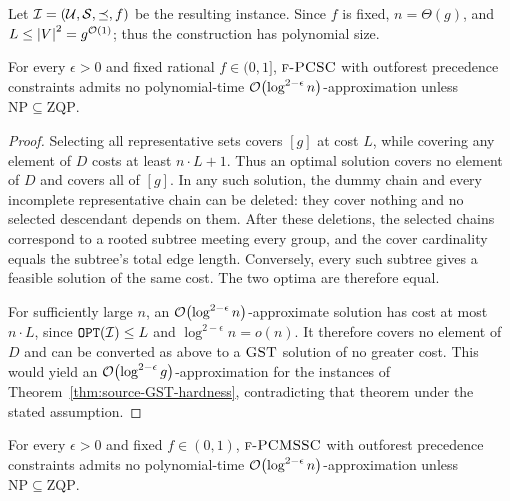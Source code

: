     Let $\mathcal{I}=(\mathcal{U},\mathcal{S},\preceq,f)$ be the resulting instance. Since $f$ is fixed, $n=\Theta(g)$, and $L\leq\mathopen{}\left| V \right|^2=g^{\mathcal{O}(1)}$; thus the construction has polynomial size.

\begin{theorem}\label{thm:PCSC-outforest-hardness}
    For every $\epsilon>0$ and fixed rational $f\in(0,1]$, $\textup{\textsc{f-PCSC}}$ with outforest precedence constraints admits no polynomial-time $\mathcal{O}\mathopen{}\left( \log^{2-\epsilon} n \right)$-approximation unless $\mathrm{NP}\subseteq\mathrm{ZQP}$.
\end{theorem}
\begin{proof}
    Selecting all representative sets covers $[g]$ at cost $L$, while covering any element of $D$ costs at least $n\cdot L+1$. Thus an optimal solution covers no element of $D$ and covers all of $[g]$. In any such solution, the dummy chain and every incomplete representative chain can be deleted: they cover nothing and no selected descendant depends on them. After these deletions, the selected chains correspond to a rooted subtree meeting every group, and the cover cardinality equals the subtree's total edge length. Conversely, every such subtree gives a feasible solution of the same cost. The two optima are therefore equal.

    For sufficiently large $n$, an $\mathcal{O}\mathopen{}\left( \log^{2-\epsilon}n \right)$-approximate solution has cost at most $n\cdot L$, since $\texttt{OPT}\mathopen{}\left( \mathcal{I} \right)\leq L$ and $\log^{2-\epsilon}n=o(n)$. It therefore covers no element of $D$ and can be converted as above to a $\textup{\textsc{GST}}$ solution of no greater cost. This would yield an $\mathcal{O}\mathopen{}\left( \log^{2-\epsilon}g \right)$-approximation for the instances of Theorem~\ref{thm:source-GST-hardness}, contradicting that theorem under the stated assumption.
\end{proof}
\begin{theorem}\label{thm:PCMSSC-outforest-hardness}
    For every $\epsilon>0$ and fixed $f\in(0,1)$, $\textup{\textsc{f-PCMSSC}}$ with outforest precedence constraints admits no polynomial-time $\mathcal{O}\mathopen{}\left( \log^{2-\epsilon} n \right)$-approximation unless $\mathrm{NP}\subseteq\mathrm{ZQP}$.
\end{theorem}
